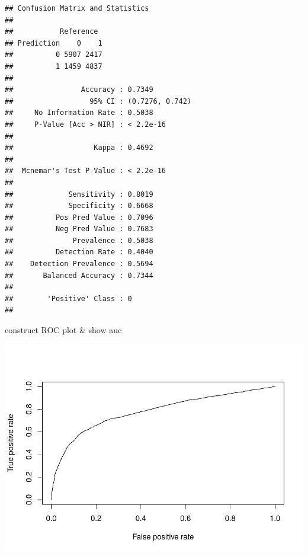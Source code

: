 \documentclass[
]{article}
\newenvironment{Shaded}{\begin{snugshade}}{\end{snugshade}}
\newcommand{\AttributeTok}[1]{\textcolor[rgb]{0.77,0.63,0.00}{#1}}
\newcommand{\DecValTok}[1]{\textcolor[rgb]{0.00,0.00,0.81}{#1}}
\newcommand{\FunctionTok}[1]{\textcolor[rgb]{0.00,0.00,0.00}{#1}}
\newcommand{\NormalTok}[1]{#1}
\newcommand{\OtherTok}[1]{\textcolor[rgb]{0.56,0.35,0.01}{#1}}
\newcommand{\SpecialCharTok}[1]{\textcolor[rgb]{0.00,0.00,0.00}{#1}}
\newcommand{\StringTok}[1]{\textcolor[rgb]{0.31,0.60,0.02}{#1}}
\begin{document}
\begin{verbatim}
## Confusion Matrix and Statistics
## 
##           Reference
## Prediction    0    1
##          0 5907 2417
##          1 1459 4837
##                                          
##                Accuracy : 0.7349         
##                  95% CI : (0.7276, 0.742)
##     No Information Rate : 0.5038         
##     P-Value [Acc > NIR] : < 2.2e-16      
##                                          
##                   Kappa : 0.4692         
##                                          
##  Mcnemar's Test P-Value : < 2.2e-16      
##                                          
##             Sensitivity : 0.8019         
##             Specificity : 0.6668         
##          Pos Pred Value : 0.7096         
##          Neg Pred Value : 0.7683         
##              Prevalence : 0.5038         
##          Detection Rate : 0.4040         
##    Detection Prevalence : 0.5694         
##       Balanced Accuracy : 0.7344         
##                                          
##        'Positive' Class : 0              
## 
\end{verbatim}

construct ROC plot \& show auc

\begin{Shaded}
\end{Shaded}

\includegraphics{part1_files/figure-latex/unnamed-chunk-28-1.pdf}
\end{document}
